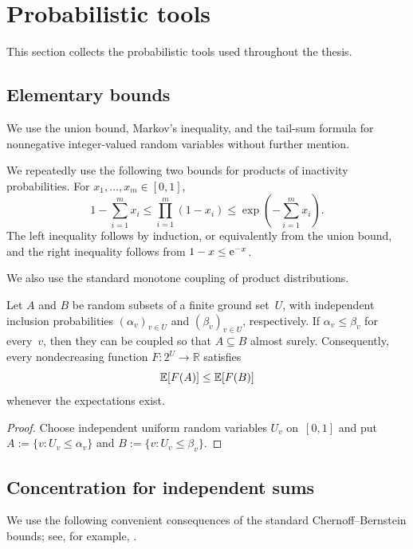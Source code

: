 \documentclass[12pt,a4paper,oneside]{report}
\begin{document}
\section{Probabilistic tools}\label{sec:probabilistic-inequalities}

This section collects the probabilistic tools used throughout the thesis.

\subsection{Elementary bounds}

We use the union bound, Markov's inequality, and the tail-sum formula for
nonnegative integer-valued random variables without further mention.

We repeatedly use the following two bounds for products of inactivity
probabilities.  For $x_1,\ldots,x_m\in[0,1]$,
\begin{equation}\label{eq:bernoulli-product-bounds}
    1-\sum_{i=1}^m x_i
    \le\prod_{i=1}^m(1-x_i)
    \le\exp\left(-\sum_{i=1}^m x_i\right).
\end{equation}
The left inequality follows by induction, or equivalently from the union
bound, and the right inequality follows from $1-x\le\mathrm{e}^{-x}$.

We also use the standard monotone coupling of product distributions.
\begin{lemma}\label{lem:monotone-product-coupling}
Let $A$ and $B$ be random subsets of a finite ground set~$U$, with independent
inclusion probabilities $(\alpha_v)_{v\in U}$ and $(\beta_v)_{v\in U}$,
respectively.  If $\alpha_v\le\beta_v$ for every~$v$, then they can be coupled
so that $A\subseteq B$ almost surely.  Consequently, every nondecreasing
function $F:2^U\to\mathbb R$ satisfies
\[
    \mathbb{E}[F(A)]\le\mathbb{E}[F(B)]
\]
whenever the expectations exist.
\end{lemma}
\begin{proof}
Choose independent uniform random variables $U_v$ on~$[0,1]$ and put
$A:=\{v:U_v\le\alpha_v\}$ and $B:=\{v:U_v\le\beta_v\}$.
\end{proof}

\subsection{Concentration for independent sums}

We use the following convenient consequences of the standard
Chernoff--Bernstein bounds; see, for example,
\cite[Chapter~2]{BoucheronLugosiMassart2013}.
\end{document}
